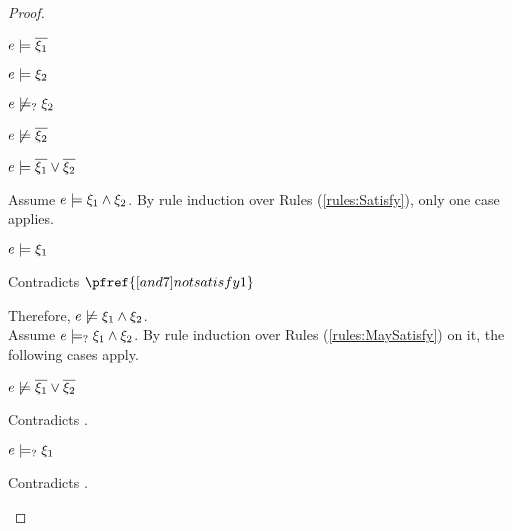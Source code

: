\begin{proof}
\begin{byCases}
\begin{byCases}
\begin{pfsteps*}
        \item $e \models \overline{\xi_1}$  
        \item $e \models \xi_2$  
        \item $e \not\models_{?} \xi_2$  
        \item $e \not\models \overline{\xi_2}$  
        \item $e \models \overline{\xi_1} \vee \overline{\xi_2}$  
        \end{pfsteps*}
        Assume $e \models \xi_1 \wedge \xi_2$. By rule induction over Rules (\ref{rules:Satisfy}), only one case applies.
        \begin{byCases}
        \item[\text{(\ref{rule:CSAnd})}]
            \begin{pfsteps*}
            \item $e \models \xi_1$ 
            \end{pfsteps*}
            Contradicts $\pfref{[and7]notsatisfy1}$
        \end{byCases}
        Therefore, $e \not\models \xi_1 \wedge \xi_2$.\\
        Assume $e \models_{?} \xi_1 \wedge \xi_2$. By rule induction over Rules (\ref{rules:MaySatisfy}) on it, the following cases apply.
        \begin{byCases}
        \item[\text{(\ref{rule:CMSNotVal})}]
            \begin{pfsteps*}
            \item $e \not\models \overline{\xi_1} \vee \overline{\xi_2}$ 
            \end{pfsteps*}
            Contradicts .
        \item[\text{(\ref{rule:CMSAnd1})}]
            \begin{pfsteps*}
            \item $e \models_{?} \xi_1$ 
            \end{pfsteps*}
            Contradicts .
        \item[\text{(\ref{rule:CMSAnd2})}]

\end{byCases}
\end{byCases}
\end{byCases}
\end{proof}
